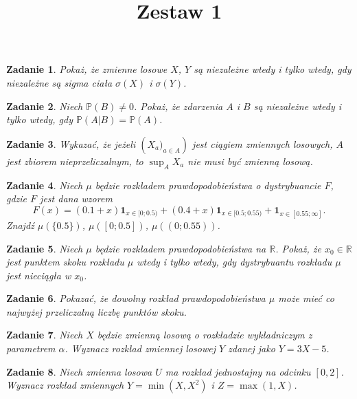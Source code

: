 \documentclass{mwart}
\title{Zestaw 1}
\newtheorem{zd}{Zadanie}
\begin{document}

\maketitle
\begin{zd}
Pokaż, że zmienne losowe $X$, $Y$ są niezależne wtedy i tylko wtedy, gdy niezależne są sigma ciała $\sigma(X)$ i $\sigma(Y)$.
\end{zd}

\begin{zd}
Niech $\mathbb{P}(B)\neq 0$. Pokaż, że zdarzenia $A$ i $B$ są niezależne wtedy i tylko wtedy, gdy $\mathbb{P}(A|B) = \mathbb{P}(A)$.
\end{zd}

\begin{zd}
Wykazać, że jeżeli $\left(X_a)_{a\in A}\right)$ jest ciągiem zmiennych losowych, $A$ jest zbiorem nieprzeliczalnym, to $\sup_AX_a$ nie musi być zmienną losową.
\end{zd}

\begin{zd}
Niech $\mu$ będzie rozkładem prawdopodobieństwa o dystrybuancie $F$, gdzie $F$ jest dana wzorem
\begin{displaymath}
F(x) = (0.1+x)\pmb{1}_{x\in[0; 0.5)} + (0.4+x)\pmb{1}_{x\in[0.5; 0.55)} + \pmb{1}_{x\in[0.55; \infty]}.
\end{displaymath}
Znajdź $\mu(\{0.5\})$, $\mu([0; 0.5])$, $\mu((0; 0.55))$.
\end{zd}

\begin{zd}
Niech $\mu$ będzie rozkładem prawdopodobieństwa na $\mathbb{R}$. Pokaż, że $x_0\in \mathbb{R}$ jest punktem skoku rozkładu $\mu$ wtedy i tylko wtedy, gdy dystrybuantu rozkładu $\mu$ jest nieciągła w $x_0$.
\end{zd}

\begin{zd}
Pokazać, że dowolny rozkład prawdopodobieństwa $\mu$ może mieć co najwyżej przeliczalną liczbę punktów skoku.
\end{zd}

\begin{zd}
Niech $X$ będzie zmienną losową o rozkładzie wykładniczym z parametrem $\alpha$. Wyznacz rozkład zmiennej losowej $Y$ zdanej jako $Y=3X-5$.
\end{zd}

\begin{zd}
Niech zmienna losowa $U$ ma rozkład jednostajny na odcinku $[0, 2]$. Wyznacz rozkład zmiennych $Y=\min(X, X^2)$ i $Z=\max(1, X)$.
\end{zd}
\end{document}
